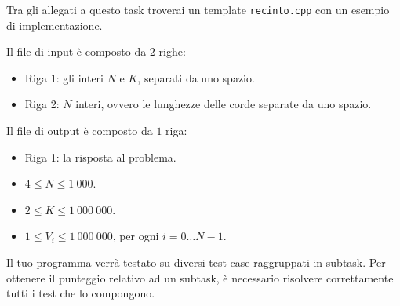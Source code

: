 \begin{warning}
    Tra gli allegati a questo task troverai un template \texttt{recinto.cpp} con un esempio di implementazione.
\end{warning}

Il file di input è composto da $2$ righe:
\begin{itemize}
    \item Riga 1: gli interi $N$ e $K$, separati da uno spazio.
    \item Riga 2: $N$ interi, ovvero le lunghezze delle corde separate da uno spazio.
\end{itemize}

Il file di output è composto da $1$ riga:
\begin{itemize}
    \item Riga 1: la risposta al problema.
\end{itemize}


\Constraints

\begin{itemize}[nolistsep, itemsep=2mm]
    \item $4 \le N \le 1\:000$.
    \item $2 \le K \le 1\:000\:000$.
    \item $1 \le V_i \le 1\:000\:000$, per ogni $i = 0 \dots N-1$.
\end{itemize}


\Scoring

Il tuo programma verrà testato su diversi test case raggruppati in subtask.
Per ottenere il punteggio relativo ad un subtask,
è necessario risolvere correttamente tutti i test che lo compongono.








